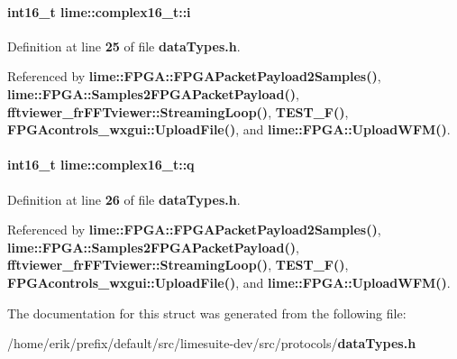 \paragraph[{i}]{\setlength{\rightskip}{0pt plus 5cm}int16\+\_\+t lime\+::complex16\+\_\+t\+::i}\label{structlime_1_1complex16__t_acc9a7817fe710cb2cbccb26fe6bf6f41}


Definition at line {\bf 25} of file {\bf data\+Types.\+h}.



Referenced by {\bf lime\+::\+F\+P\+G\+A\+::\+F\+P\+G\+A\+Packet\+Payload2\+Samples()}, {\bf lime\+::\+F\+P\+G\+A\+::\+Samples2\+F\+P\+G\+A\+Packet\+Payload()}, {\bf fftviewer\+\_\+fr\+F\+F\+Tviewer\+::\+Streaming\+Loop()}, {\bf T\+E\+S\+T\+\_\+\+F()}, {\bf F\+P\+G\+Acontrols\+\_\+wxgui\+::\+Upload\+File()}, and {\bf lime\+::\+F\+P\+G\+A\+::\+Upload\+W\+F\+M()}.

\paragraph[{q}]{\setlength{\rightskip}{0pt plus 5cm}int16\+\_\+t lime\+::complex16\+\_\+t\+::q}\label{structlime_1_1complex16__t_ac1617452a024dadc3dbbd796a71af2ff}


Definition at line {\bf 26} of file {\bf data\+Types.\+h}.



Referenced by {\bf lime\+::\+F\+P\+G\+A\+::\+F\+P\+G\+A\+Packet\+Payload2\+Samples()}, {\bf lime\+::\+F\+P\+G\+A\+::\+Samples2\+F\+P\+G\+A\+Packet\+Payload()}, {\bf fftviewer\+\_\+fr\+F\+F\+Tviewer\+::\+Streaming\+Loop()}, {\bf T\+E\+S\+T\+\_\+\+F()}, {\bf F\+P\+G\+Acontrols\+\_\+wxgui\+::\+Upload\+File()}, and {\bf lime\+::\+F\+P\+G\+A\+::\+Upload\+W\+F\+M()}.



The documentation for this struct was generated from the following file\+:\begin{DoxyCompactItemize}
\item 
/home/erik/prefix/default/src/limesuite-\/dev/src/protocols/{\bf data\+Types.\+h}\end{DoxyCompactItemize}
